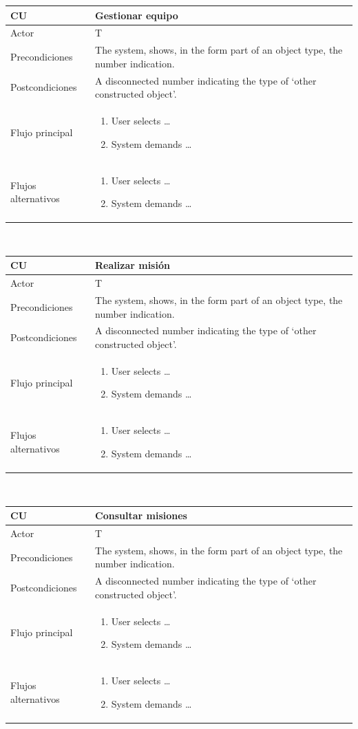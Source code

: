 \documentclass[twoside]{report}
\newcommand\addrow[2]{#1 &#2\\ }
\newcommand\addheading[2]{#1 &#2\\ \hline}
\newcommand\tabularhead{\begin{tabular}{lp{0.7\textwidth}}
\hline
}
\newcommand\addmulrow[2]{ \begin{minipage}[t][][t]{2.5cm}#1\end{minipage}%
   &\begin{minipage}[t][][t]{8cm}
    \begin{enumerate} #2   \end{enumerate}
    \end{minipage}\\ }
\newenvironment{usecase}{\tabularhead}
{\hline\end{tabular}}
\begin{document}

\begin{usecase}
  \addheading{\textbf{CU\arabic{usecase}}}{Gestionar equipo} 
  \addrow{Actor}{T}
  \addrow{Precondiciones}{The system, shows, in the form part of an object type, the number indication.}
  \addrow{Postcondiciones}{A disconnected number indicating the type of `other constructed object'.}
  \addmulrow{Flujo principal}{
  		\item User selects \ldots
        \item System demands \ldots
  }
  \addmulrow{Flujos alternativos}{
  		\item User selects \ldots
        \item System demands \ldots
  }
\end{usecase}\\

\begin{usecase}
  \addheading{\textbf{CU\arabic{usecase}}}{Realizar misión} 
  \addrow{Actor}{T}
  \addrow{Precondiciones}{The system, shows, in the form part of an object type, the number indication.}
  \addrow{Postcondiciones}{A disconnected number indicating the type of `other constructed object'.}
  \addmulrow{Flujo principal}{
  		\item User selects \ldots
        \item System demands \ldots
  }
  \addmulrow{Flujos alternativos}{
  		\item User selects \ldots
        \item System demands \ldots
  }
\end{usecase}\\

\begin{usecase}
  \addheading{\textbf{CU\arabic{usecase}}}{Consultar misiones} 
  \addrow{Actor}{T}
  \addrow{Precondiciones}{The system, shows, in the form part of an object type, the number indication.}
  \addrow{Postcondiciones}{A disconnected number indicating the type of `other constructed object'.}
  \addmulrow{Flujo principal}{
  		\item User selects \ldots
        \item System demands \ldots
  }
  \addmulrow{Flujos alternativos}{
  		\item User selects \ldots
        \item System demands \ldots
  }
\end{usecase}\\
\end{document}
